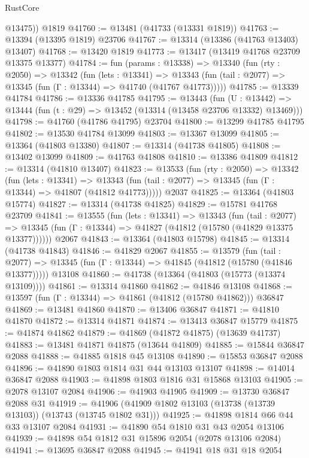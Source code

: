 \begin{lexlean}{RustCore}
\begin{coremodule}
        @13475))
    @1819
@41760 := @13481 (@41733 (@13331 @1819))
@41763 := @13394 (@13395 @1819) @23706
@41767 := @13314 (@13386 (@41763 @13403) @13407)
@41768 := @13420 @1819
@41773 := @13417 (@13419 @41768 @23709 @13375 @13377)
@41784 := fun (params : @13338) =>
  @13340
    (fun (rty : @2050) =>
    @13342
      (fun (lets : @13341) =>
      @13343 (fun (tail : @2077) => @13345 (fun (Γ : @13344) => @41740 (@41767 @41773)))))
@41785 := @13339 @41784
@41786 := @13336 @41785
@41795 := @13443
    (fun (U : @13442) => @13444 (fun (t : @29) => @13452 (@13314 (@13458 @23706 @13332) @13469)))
@41798 := @41760 (@41786 @41795) @23704
@41800 := @13299 @41785 @41795
@41802 := @13530 @41784 @13099
@41803 := @13367 @13099
@41805 := @13364 (@41803 @13380)
@41807 := @13314 (@41738 @41805)
@41808 := @13402 @13099
@41809 := @41763 @41808
@41810 := @13386 @41809
@41812 := @13314 (@41810 @13407)
@41823 := @13533
    (fun (rty : @2050) =>
    @13342
      (fun (lets : @13341) =>
      @13343 (fun (tail : @2077) => @13345 (fun (Γ : @13344) => @41807 (@41812 @41773)))))
    @2037
@41825 := @13364 (@41803 @15774)
@41827 := @13314 (@41738 @41825)
@41829 := @15781 @41768 @23709
@41841 := @13555
    (fun (lets : @13341) =>
    @13343
      (fun (tail : @2077) =>
      @13345 (fun (Γ : @13344) => @41827 (@41812 (@15780 (@41829 @13375 @13377))))))
    @2067
@41843 := @13364 (@41803 @15798)
@41845 := @13314 (@41738 @41843)
@41846 := @41829 @2067
@41855 := @13579
    (fun (tail : @2077) => @13345 (fun (Γ : @13344) => @41845 (@41812 (@15780 (@41846 @13377)))))
    @13108
@41860 := @41738 (@13364 (@41803 (@15773 (@13374 @13109))))
@41861 := @13314 @41860
@41862 := @41846 @13108
@41868 := @13597 (fun (Γ : @13344) => @41861 (@41812 (@15780 @41862))) @36847
@41869 := @13481 @41860
@41870 := @13406 @36847
@41871 := @41810 @41870
@41872 := @13314 @41871
@41874 := @13413 @36847 @15779
@41875 := @41874 @41862
@41879 := @41869 (@41872 @41875) (@13639 @41737)
@41883 := @13481 @41871 @41875 (@13644 @41809)
@41885 := @15844 @36847 @2088
@41888 := @41885 @1818 @45 @13108
@41890 := @15853 @36847 @2088
@41896 := @41890 @1803 @1814 @31 @44 @13103 @13107
@41898 := @14014 @36847 @2088
@41903 := @41898 @1803 @1816 @31 @15868 @13103
@41905 := @2078 @13107 @2084
@41906 := @41903 @41905
@41909 := @13730 @36847 @2088 @31
@41919 := @41906 (@41909 @1802 @13103 (@13738 (@13739 @13103)) (@13743 (@13745 @1802 @31)))
@41925 := @41898 @1814 @66 @44 @33 @13107 @2084
@41931 := @41890 @54 @1810 @31 @43 @2054 @13106
@41939 := @41898 @54 @1812 @31 @15896 @2054 (@2078 @13106 @2084)
@41941 := @13695 @36847 @2088
@41945 := @41941 @18 @31 @18 @2054

\end{coremodule}
\end{lexlean}
